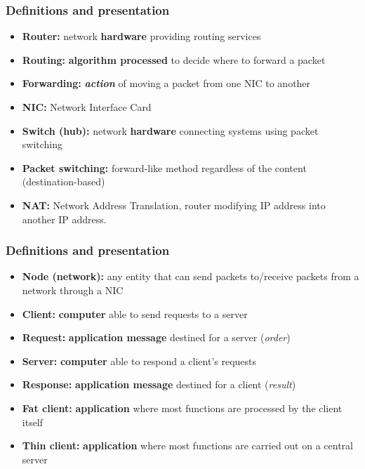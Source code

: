   \begin{frame}
    \frametitle{Definitions and presentation}
      \begin{itemize}
        \item \textbf{Router:} network \textbf{hardware} providing routing services\pause
        \item \textbf{Routing:} \textbf{algorithm processed} to decide where to forward a packet\pause
        \item \textbf{Forwarding:} \textbf{\emph{action}} of moving a packet from one NIC to another\pause
        \item \textbf{NIC:} Network Interface Card
        \item \textbf{Switch (hub):} network \textbf{hardware} connecting systems using packet switching\pause
        \item \textbf{Packet switching:} forward-like method regardless of the content (destination-based)\pause
        \item \textbf{NAT:} Network Address Translation, router modifying IP address into another IP address.
      \end{itemize}
  \end{frame}
  \begin{frame}
    \frametitle{Definitions and presentation}
      \begin{itemize}
        \item \textbf{Node (network):} any entity that can send packets to/receive packets from a network through a NIC\pause
        \item \textbf{Client:} \textbf{computer} able to send requests to a server\pause
        \item \textbf{Request:} \textbf{application message} destined for a server (\emph{order})\pause
        \item \textbf{Server:} \textbf{computer} able to respond a client's requests\pause
        \item \textbf{Response:} \textbf{application message} destined for a client (\emph{result})\pause
        \item \textbf{Fat client:} \textbf{application} where most functions are processed by the client itself\pause
        \item \textbf{Thin client:} \textbf{application} where most functions are carried out on a central server
      \end{itemize}
  \end{frame}

